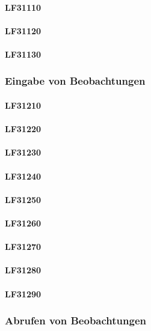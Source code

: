 \documentclass[a4paper,11pt]{article}             %
\begin{document}
			\paragraph{LF31110}
			\paragraph{LF31120}
			\paragraph{LF31130}
			
		\subsubsection{Eingabe von Beobachtungen}
			\paragraph{LF31210}
			\paragraph{LF31220}
			\paragraph{LF31230}
			\paragraph{LF31240}
			\paragraph{LF31250}
			\paragraph{LF31260}
			\paragraph{LF31270}
			\paragraph{LF31280}
			\paragraph{LF31290}
			
		\subsubsection{Abrufen von Beobachtungen}
\end{document}
